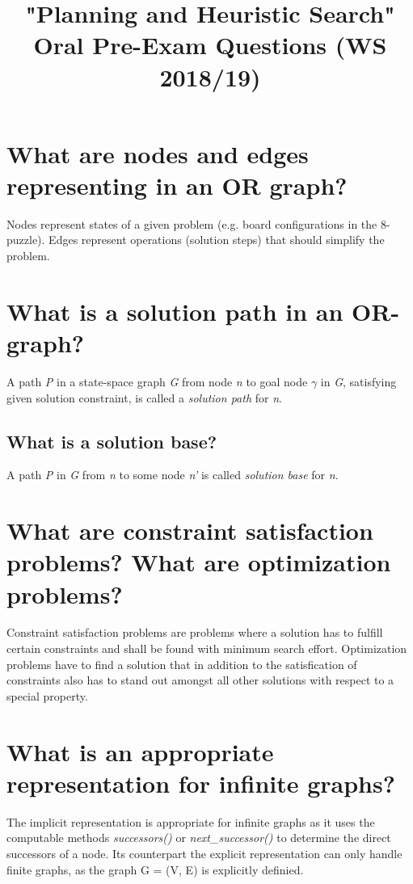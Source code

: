 \documentclass[12pt, a4paper]{article}
\begin{document}
\title{"Planning and Heuristic Search" \\ Oral Pre-Exam Questions (WS 2018/19)}
\date{}
\maketitle
%
\section{What are nodes and edges representing in an OR graph?}
Nodes represent states of a given problem (e.g. board configurations in the 8-puzzle). Edges represent operations (solution steps) that should simplify the problem.


\section{What is a solution path in an OR-graph?}
A path \textit{P} in a state-space graph \textit{G} from node \textit{n} to goal node $\gamma$ in \textit{G}, satisfying given solution constraint,  is called a \textit{solution path} for \textit{n}. 
\subsection*{What is a solution base?}
A path \textit{P} in \textit{G} from \textit{n} to some node \textit{n'} is called \textit{solution base} for \textit{n}.


\section{What are constraint satisfaction problems? What are optimization problems?}
Constraint satisfaction problems are problems where a solution has to fulfill certain constraints and shall be found with minimum search effort. Optimization problems have to find a solution that in addition to the satisfication of constraints also has to stand out amongst all other solutions with respect to a special property.


\section{What is an appropriate representation for infinite graphs?}
The implicit representation is appropriate for infinite graphs as it uses the computable methods \textit{successors()} or \textit{next\_successor()} to determine the direct successors of a node. Its counterpart the explicit representation can only handle finite graphs, as the graph G = (V, E) is explicitly definied.
\end{document}
